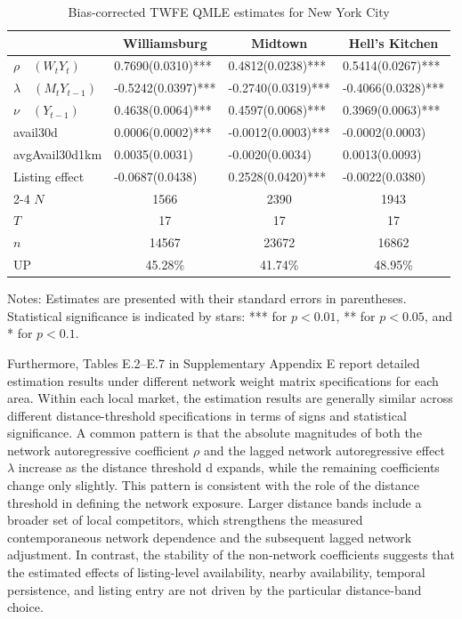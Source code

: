 \documentclass[11pt,a4paper]{article}
\begin{document}
\begin{table}[H]
\centering
\caption{Bias-corrected TWFE QMLE estimates for New York City}\label{Tab_ComV_TWFE}
\begin{tabular}{llll}
\hline
\multicolumn{1}{c}{} & \multicolumn{1}{c}{Williamsburg} & \multicolumn{1}{c}{Midtown} & \multicolumn{1}{c}{Hell's Kitchen} \\
\hline
$\rho \quad (W_tY_t)$ & \phantom{-}0.7690(0.0310)*** & \phantom{-}0.4812(0.0238)*** & \phantom{-}0.5414(0.0267)*** \\
$\lambda \quad (M_tY_{t-1})$ & -0.5242(0.0397)*** & -0.2740(0.0319)*** & -0.4066(0.0328)*** \\
$\nu \quad (Y_{t-1})$ & \phantom{-}0.4638(0.0064)*** & \phantom{-}0.4597(0.0068)*** & \phantom{-}0.3969(0.0063)*** \\
avail30d & \phantom{-}0.0006(0.0002)*** & -0.0012(0.0003)*** & -0.0002(0.0003) \\
avgAvail30d1km & \phantom{-}0.0035(0.0031) & -0.0020(0.0034) & \phantom{-}0.0013(0.0093) \\
Listing effect & -0.0687(0.0438) & \phantom{-}0.2528(0.0420)*** & -0.0022(0.0380) \\
\cline{2-4}
$N$ & \multicolumn{1}{c}{1566} & \multicolumn{1}{c}{2390} & \multicolumn{1}{c}{1943} \\
$T$ & \multicolumn{1}{c}{17} & \multicolumn{1}{c}{17} & \multicolumn{1}{c}{17} \\
$n$ & \multicolumn{1}{c}{14567} & \multicolumn{1}{c}{23672} & \multicolumn{1}{c}{16862} \\
UP & \multicolumn{1}{c}{45.28\%} & \multicolumn{1}{c}{41.74\%} & \multicolumn{1}{c}{48.95\%} \\
\hline
\end{tabular}
\begin{flushleft}
\footnotesize
Notes: Estimates are presented with their standard errors in parentheses. Statistical significance is indicated by stars: *** for $p<0.01$, ** for $p<0.05$, and * for $p<0.1$.
\end{flushleft}
\end{table}
Furthermore, Tables E.2–E.7 in Supplementary Appendix E report detailed estimation results under different network weight matrix specifications for each area. Within each local market, the estimation results are generally similar across different distance-threshold specifications in terms of signs and statistical significance. A common pattern is that the absolute magnitudes of both the network autoregressive coefficient $\rho$ and the lagged network autoregressive effect $\lambda$ increase as the distance threshold d expands, while the remaining coefficients change only slightly. This pattern is consistent with the role of the distance threshold in defining the network exposure. Larger distance bands include a broader set of local competitors, which strengthens the measured contemporaneous network dependence and the subsequent lagged network adjustment. In contrast, the stability of the non-network coefficients suggests that the estimated effects of listing-level availability, nearby availability, temporal persistence, and listing entry are not driven by the particular distance-band choice.
\end{document}
